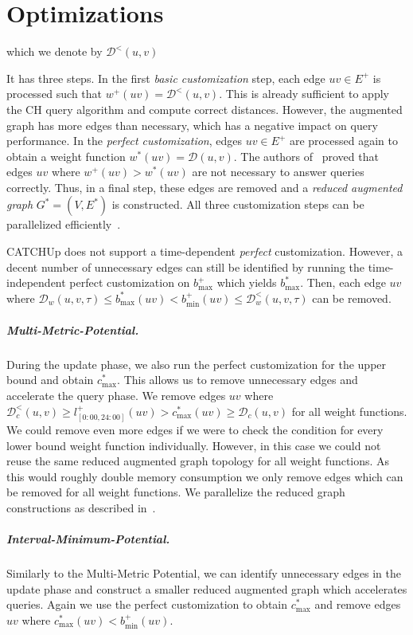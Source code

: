 \documentclass[a4paper,UKenglish,cleveref, autoref, thm-restate,anonymous]{lipics-v2021}
\newcommand*{\comb}{c}
\newcommand*{\dist}{\mathcal{D}}
\begin{document}
\section{Optimizations}\label{sec:appendix:optimizations}

which we denote by $\dist^<(u,v)$

It has three steps.
In the first \emph{basic customization} step, each edge $uv \in E^+$ is processed such that $w^+(uv) = \dist^<(u,v)$.
This is already sufficient to apply the CH query algorithm and compute correct distances.
However, the augmented graph has more edges than necessary, which has a negative impact on query performance.
In the \emph{perfect customization}, edges $uv \in E^+$ are processed again to obtain a weight function $w^*(uv) = \dist(u,v)$.
The authors of~\cite{dsw-cch-15} proved that edges $uv$ where $w^+(uv) > w^*(uv)$ are not necessary to answer queries correctly.
Thus, in a final step, these edges are removed and a \emph{reduced augmented graph} $G^*=(V, E^*)$ is constructed.
All three customization steps can be parallelized efficiently~\cite{bsw-rttau-19}.

CATCHUp does not support a time-dependent \emph{perfect} customization.
However, a decent number of unnecessary edges can still be identified by running the time-independent perfect customization on $b^+_{\max}$ which yields $b^*_{\max}$.
Then, each edge $uv$ where $\dist_w(u,v,\tau) \leq b^*_{\max}(uv) < b^+_{\min}(uv) \leq \dist^<_w(u,v,\tau)$ can be removed.

\subparagraph{Multi-Metric-Potential.}
During the update phase, we also run the perfect customization for the upper bound and obtain $\comb^*_{\max}$.
This allows us to remove unnecessary edges and accelerate the query phase.
We remove edges $uv$ where $\dist^<_c(u,v) \geq l_{[0:00, 24:00]}^+(uv) > \comb^*_{\max}(uv) \geq \dist_c(u,v)$ for all weight functions.
We could remove even more edges if we were to check the condition for every lower bound weight function individually.
However, in this case we could not reuse the same reduced augmented graph topology for all weight functions.
As this would roughly double memory consumption we only remove edges which can be removed for all weight functions.
We parallelize the reduced graph constructions as described in~\cite{bsw-rttau-19}.

\subparagraph{Interval-Minimum-Potential.}
Similarly to the Multi-Metric Potential, we can identify unnecessary edges in the update phase and construct a smaller reduced augmented graph which accelerates queries.
Again we use the perfect customization to obtain $\comb^*_{\max}$ and remove edges $uv$ where $\comb^*_{\max}(uv) < b^+_{\min}(uv)$.%
\end{document}
